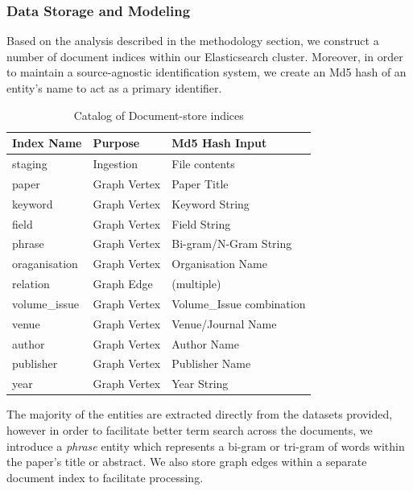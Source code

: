 \documentclass[10pt,journal,final,a4paper]{IEEEtran}
\begin{document}
\subsubsection{Data Storage and Modeling}
Based on the analysis described in the methodology section, we construct a number of document indices within our Elasticsearch cluster. Moreover, in order to maintain a source-agnostic identification system, we create an Md5 hash of an entity's name to act as a primary identifier. 
\begin{table}[ht]
\centering
\begin{tabular}{lll}
\hline
Index Name    & Purpose      & Md5 Hash Input            \\ \hline
staging       & Ingestion    & File contents             \\ \hline
paper         & Graph Vertex & Paper Title               \\ \hline
keyword       & Graph Vertex & Keyword String            \\ \hline
field         & Graph Vertex & Field String              \\ \hline
phrase        & Graph Vertex & Bi-gram/N-Gram String      \\ \hline
oraganisation & Graph Vertex & Organisation Name         \\ \hline
relation      & Graph Edge   & (multiple)                \\ \hline
volume\_issue & Graph Vertex & Volume\_Issue combination \\ \hline
venue         & Graph Vertex & Venue/Journal Name        \\ \hline
author        & Graph Vertex & Author Name               \\ \hline
publisher     & Graph Vertex & Publisher Name            \\ \hline
year          & Graph Vertex & Year String               \\ \hline
\end{tabular}
\caption{Catalog of Document-store indices}
\end{table}

The majority of the entities are extracted directly from the datasets provided, however in order to facilitate better term search across the documents, we introduce a \textit{phrase} entity which represents a bi-gram or tri-gram of words within the paper's title or abstract. We also store graph edges within a separate document index to facilitate processing.
\end{document}
